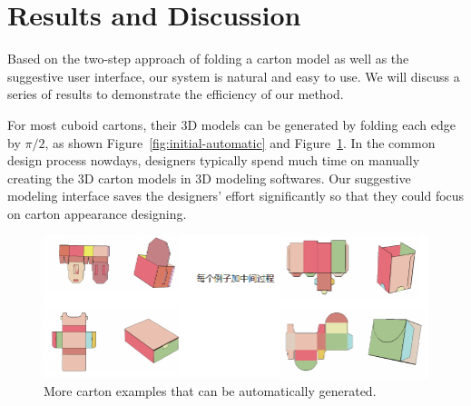 \section{Results and Discussion}\label{sec:result}



Based on the two-step approach of folding a carton model as well as the suggestive user interface, our system is natural and easy to use. 
%
We will discuss a series of results to demonstrate the efficiency of our method. 


For most cuboid cartons, their 3D models can be generated by folding each edge by $\pi/2$, as shown Figure~\ref{fig:initial-automatic} and Figure~\ref{fig:automatic-more}.
In the common design process nowdays, designers typically spend much time on manually creating the 3D carton models in 3D modeling softwares. 
Our suggestive modeling interface saves the designers' effort significantly so that they could focus on carton appearance designing. 


\begin{figure}
	\centering
	\includegraphics[width=\textwidth]{images/auto-more.png}
	\caption{More carton examples that can be automatically generated.}
	\label{fig:automatic-more}
	
\end{figure}


